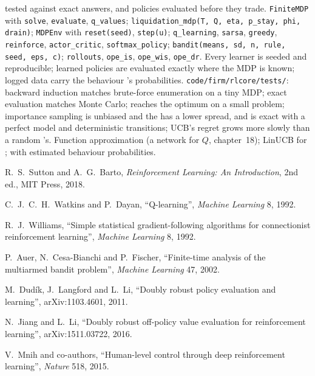 \begin{build}
  tested against exact answers, and policies evaluated before they trade.
 \texttt{FiniteMDP} with \texttt{solve}, \texttt{evaluate}, \texttt{q\_values};
\texttt{liquidation\_mdp(T, Q, eta, p\_stay, phi, drain)}; \texttt{MDPEnv} with \texttt{reset(seed)}, \texttt{step(u)};
\texttt{q\_learning}, \texttt{sarsa}, \texttt{greedy}, \texttt{reinforce}, \texttt{actor\_critic}, \texttt{softmax\_policy};
\texttt{bandit(means, sd, n, rule, seed, eps, c)}; \texttt{rollouts}, \texttt{ope\_is}, \texttt{ope\_wis}, \texttt{ope\_dr}.
 Every learner is seeded and reproducible; learned policies are evaluated exactly where the MDP is known;
logged data carry the behaviour 's probabilities.
 \texttt{code/firm/rlcore/tests/}: backward induction matches brute-force enumeration on a tiny MDP;
exact evaluation matches Monte Carlo;  reaches the optimum on a small problem; importance sampling is unbiased
and the  has a lower spread, and is exact with a perfect model and deterministic transitions; UCB's regret grows more slowly than a random 's.
 Function approximation (a network for $Q$, chapter~18); LinUCB for ;  with estimated behaviour probabilities.
\end{build}

\begin{omsources}
\item R.~S.~Sutton and A.~G.~Barto, \emph{Reinforcement Learning: An Introduction}, 2nd ed., MIT Press, 2018.
\item C.~J.~C.~H.~Watkins and P.~Dayan, ``Q-learning'', \emph{Machine Learning} 8, 1992.
\item R.~J.~Williams, ``Simple statistical gradient-following algorithms for connectionist reinforcement learning'',
\emph{Machine Learning} 8, 1992.
\item P.~Auer, N.~Cesa-Bianchi and P.~Fischer, ``Finite-time analysis of the multiarmed bandit problem'', \emph{Machine
Learning} 47, 2002.
\item M.~Dudík, J.~Langford and L.~Li, ``Doubly robust policy evaluation and learning'', arXiv:1103.4601, 2011.
\item N.~Jiang and L.~Li, ``Doubly robust off-policy value evaluation for reinforcement learning'', arXiv:1511.03722, 2016.
\item V.~Mnih and co-authors, ``Human-level control through deep reinforcement learning'', \emph{Nature} 518, 2015.
\end{omsources}

